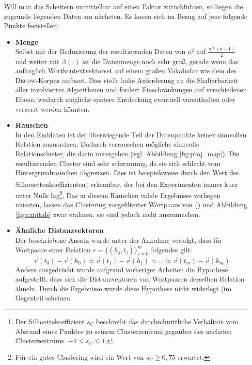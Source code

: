 Will man das Scheitern unmittelbar auf einen Faktor zurückführen, so liegen die zugrunde liegenden Daten am nächsten.
Es lassen sich im Bezug auf jene folgende Punkte feststellen:
\begin{itemize}
  \item \textbf{Menge}\\ Selbst mit der Reduzierung der resultierenden Daten von $n^2$ auf $\frac{n*(n-1)}{2}$ und weiter
  mit $\Lambda(\cdot)$ ist die
  Datenmenge noch sehr groß, gerade wenn das anfänglich Wortkontextvektorset auf einem großen Vokabular wie dem des \textsc{Decow}-Korpus aufbaut.
  Dies stellt hohe Anforderung an die Skalierbarkeit aller involvierter Algorithmen und fordert Einschränkungen auf verschiedenen
  Ebene, wodurch mögliche spätere Entdeckung eventuell vorenthalten oder verzerrt werden könnten.
  \item \textbf{Rauschen}\\ In den Enddaten ist der überwiegende Teil der Datenpunkte keiner sinnvollen Relation zuzuordnen.
  Dadurch verrauschen mögliche sinnvolle Relationscluster, die darin untergehen (vgl. Abbildung \ref{fig:proj_map}). Die resultierenden Cluster sind sehr
  schwammig, da sie sich schlecht vom Hintergrundrauschen abgrenzen. Dies ist beispielsweise durch den Wert des Silhouettenkoeffizienten\footnote{
  Der Silhoettekoeffizient $s_C$ beschreibt das durchschnittliche Verhältnis vom Abstand eines Punktes zu seinem Clusterzentrum gegnüber
  des nächsten Clusterzentrums. $-1 \leq s_C \leq 1$.}
  erkennbar, der bei den Experimenten immer kurz unter Nulls lag\footnote{Für ein gutes Clustering wird ein Wert von $s_C \geq 0,75$
  erwartet.}. Das in diesem Rauschen valide Ergebnisse vorliegen müssten, lassen das Clustering vorgefilterter Wortpaare von (\cite{fu2014learning}) und Abbildung \ref{fig:capitals}
  zwar erahnen, sie sind jedoch nicht auszumachen.
  \item \textbf{Ähnliche Distanzvektoren}\\
  Der beschriebene Ansatz wurde unter der Annahme verfolgt, dass für Wortpaare einer Relation $r=\{(h_j, t_j)\}_{j=0}^m$
  folgendes gilt:
  \begin{equation}
    \vec{v}(t_0) - \vec{v}(h_0) \approx \vec{v}(t_1) - \vec{v}(h_1) \approx \ldots \approx \vec{v}(t_m) - \vec{v}(h_m)
  \end{equation}
  Anders ausgedrückt wurde aufgrund vorheriger Arbeiten die Hypothese aufgestellt, dass sich die Distanzvektoren von
  Wortpaaren derselben Relation ähneln. Durch die Ergebnisse wurde diese Hypothese nicht widerlegt (im Gegenteil scheinen

\end{itemize}
